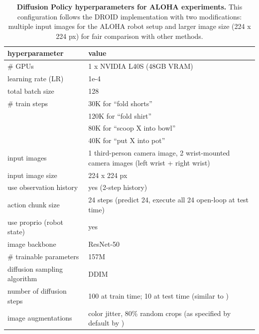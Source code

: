 \documentclass[conference]{IEEEtran}
\begin{document}
\begin{table}
\centering
\caption{\textbf{Diffusion Policy hyperparameters for ALOHA experiments.} This configuration follows the DROID implementation \citep{khazatsky2024droid} with two modifications: multiple input images for the ALOHA robot setup and larger image size (224 x 224 px) for fair comparison with other methods.}
\label{tab:diffusion_policy_hyperparameters_aloha}
\begin{tabular}{ll}
\toprule
hyperparameter & value \\
\midrule
\# GPUs & 1 x NVIDIA L40S (48GB VRAM) \\
learning rate (LR) & 1e-4 \\
total batch size & 128 \\
\# train steps & 30K for ``fold shorts'' \\
& 120K for ``fold shirt'' \\
& 80K for ``scoop X into bowl'' \\
& 40K for ``put X into pot'' \\
input images & 1 third-person camera image, 2 wrist-mounted camera images (left wrist + right wrist) \\
input image size & 224 x 224 px \\
use observation history & yes (2-step history) \\
action chunk size & 24 steps (predict 24, execute all 24 open-loop at test time) \\
use proprio (robot state) & yes \\
image backbone & ResNet-50 \\
\# trainable parameters & 157M \\
diffusion sampling algorithm & DDIM \citep{song2020denoising} \\
number of diffusion steps & 100 at train time; 10 at test time (similar to \citep{chi2023diffusion, khazatsky2024droid}) \\
image augmentations & color jitter, 80\% random crops (as specified by default by \citep{khazatsky2024droid}) \\
\bottomrule
\end{tabular}
\end{table}
\end{document}
